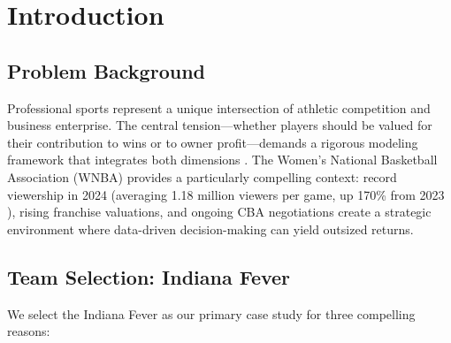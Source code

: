 \documentclass{mcmthesis}
\begin{document}
\begin{abstract}
Overall, this study provides an integrated yet operational modeling approach that connects player valuation, financial projection, roster construction, and dynamic adjustment into a unified decision-support structure.

\begin{keywords}
Sports Analytics; WNBA; Dynamic Decision Making; Shapley Value; Player Valuation; Mixed-Integer Programming; Monte Carlo Simulation; Markov Decision Process
\end{keywords}
\end{abstract}

\maketitle

\pagestyle{fancy}
\fancyhf{}
\fancyfoot[C]{\thepage}
\renewcommand{\headrulewidth}{0pt}

\tableofcontents

\newpage

\fancypagestyle{plain}{
    \fancyhf{}
    \fancyhead[L]{Team \# 2617170}
    \fancyhead[R]{Page \thepage\ of \pageref{LastPage}}
    \renewcommand{\headrulewidth}{0.4pt}
}
\pagestyle{plain}

\section{Introduction}

\subsection{Problem Background}
Professional sports represent a unique intersection of athletic competition and business enterprise. The central tension---whether players should be valued for their contribution to wins or to owner profit---demands a rigorous modeling framework that integrates both dimensions \cite{fort2004}. The Women's National Basketball Association (WNBA) provides a particularly compelling context: record viewership in 2024 (averaging 1.18 million viewers per game, up 170\% from 2023 \cite{espn2024wnba}), rising franchise valuations, and ongoing CBA negotiations create a strategic environment where data-driven decision-making can yield outsized returns.

\subsection{Team Selection: Indiana Fever}
We select the Indiana Fever as our primary case study for three compelling reasons:
\end{document}

